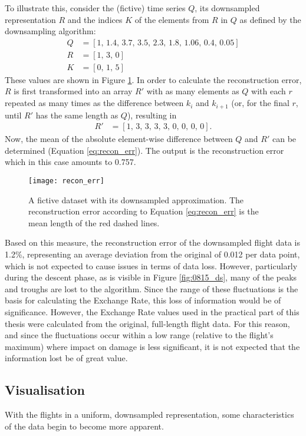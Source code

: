 To illustrate this, consider the (fictive) time series \(Q\), its downsampled representation \(R\) and the indices \(K\) of the elements from \(R\) in \(Q\) as defined by the downsampling algorithm:
\begin{align}
    Q & = [1,\,1.4,\,3.7,\,3.5,\,2.3,\,1.8,\,1.06,\,0.4,\,0.05] \\
    R & = [1,\,3,\,0] \\
    K & = [0,\,1,\,5]
\end{align}
These values are shown in Figure \ref{fig:recon_err}. In order to calculate the reconstruction error, \(R\) is first transformed into an array \(R'\) with as many elements as \(Q\) with each \(r\) repeated as many times as the difference between \(k_i\) and \(k_{i + 1}\) (or, for the final \(r\), until \(R'\) has the same length as \(Q\)), resulting in
\begin{align}
    R' & = [1,\,3,\,3,\,3,\,3,\,0,\,0,\,0,\,0].
\end{align}
Now, the mean of the absolute element-wise difference between \(Q\) and \(R'\) can be determined (Equation \ref{eq:recon_err}). The output is the reconstruction error which in this case amounts to 0.757.

\begin{figure}[tb!]
    \centering
    \texttt{[image: recon\_err]}
    \caption{\label{fig:recon_err} A fictive dataset with its downsampled approximation. The reconstruction error according to Equation \ref{eq:recon_err} is the mean length of the red dashed lines.}
\end{figure}

Based on this measure, the reconstruction error of the downsampled flight data is 1.2\%, representing an average deviation from the original of 0.012 per data point, which is not expected to cause issues in terms of data loss. However, particularly during the descent phase, as is visible in Figure \ref{fig:0815_ds}, many of the peaks and troughs are lost to the algorithm. Since the range of these fluctuations is the basis for calculating the Exchange Rate, this loss of information would be of significance. However, the Exchange Rate values used in the practical part of this thesis were calculated from the original, full-length flight data. For this reason, and since the fluctuations occur within a low range (relative to the flight's maximum) where impact on damage is less significant, it is not expected that the information lost be of great value.

\subsection{Visualisation}
With the flights in a uniform, downsampled representation, some characteristics of the data begin to become more apparent.

